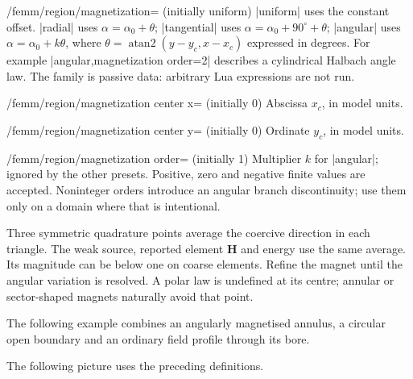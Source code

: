 \begin{key}{/femm/region/magnetization= (initially uniform)}
|uniform| uses the constant offset. |radial| uses
$\alpha=\alpha_0+\theta$; |tangential| uses
$\alpha=\alpha_0+90^\circ+\theta$; |angular| uses
$\alpha=\alpha_0+k\theta$, where
$\theta=\operatorname{atan2}(y-y_c,x-x_c)$ expressed in degrees.
For example |angular,magnetization order=2| describes a cylindrical Halbach
angle law. The family is passive data: arbitrary Lua expressions are not run.
\end{key}
\begin{key}{/femm/region/magnetization center x= (initially 0)}
Abscissa $x_c$, in model units.
\end{key}
\begin{key}{/femm/region/magnetization center y= (initially 0)}
Ordinate $y_c$, in model units.
\end{key}
\begin{key}{/femm/region/magnetization order= (initially 1)}
Multiplier $k$ for |angular|; ignored by the other presets. Positive, zero and
negative finite values are accepted. Noninteger orders introduce an angular
branch discontinuity; use them only on a domain where that is intentional.
\end{key}

Three symmetric quadrature points average the coercive direction in each
triangle. The weak source, reported element $\mathbf H$ and energy use the same
average. Its magnitude can be below one on coarse elements. Refine the magnet
until the angular variation is resolved. A polar law is undefined at its centre;
annular or sector-shaped magnets naturally avoid that point.

The following example combines an angularly magnetised annulus, a
circular open boundary and an ordinary field profile through its bore.


\begin{codeexample}
\end{codeexample}

The following picture uses the preceding definitions.


